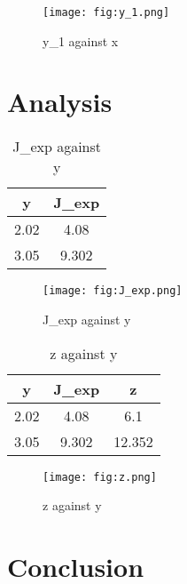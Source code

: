 \documentclass{article}
\begin{document}
\begin{figure}[H]
    \centering
    \texttt{[image: fig:y\_1.png]}
    \caption{y_1 against x}
    \label{fig:y_1}
\end{figure}

\section{Analysis}

\begin{table}[H]
    \centering
    \begin{tabular}{|c|c|}
	\hline
	y & J_exp\\
	\hline
	2.02 & 4.08\\
	\hline
	3.05 & 9.302\\
	\hline
        
    \end{tabular}
    \caption{J_exp against y}
    \label{tab:J_exp}
\end{table}


\begin{figure}[H]
    \centering
    \texttt{[image: fig:J\_exp.png]}
    \caption{J_exp against y}
    \label{fig:J_exp}
\end{figure}


\begin{table}[H]
    \centering
    \begin{tabular}{|c|c|c|}
	\hline
	y & J_exp & z\\
	\hline
	2.02 & 4.08 & 6.1\\
	\hline
	3.05 & 9.302 & 12.352\\
	\hline
        
    \end{tabular}
    \caption{z against y}
    \label{tab:z}
\end{table}


\begin{figure}[H]
    \centering
    \texttt{[image: fig:z.png]}
    \caption{z against y}
    \label{fig:z}
\end{figure}

\section{Conclusion}
\end{document}
